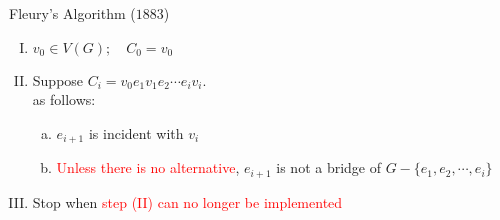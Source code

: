 
\begin{frame}{}
  

  \begin{columns}
      \begin{center}
	\pause
	 \\[5pt]
	\pause
	 \\[5pt]
	\pause
      \end{center}
  \end{columns}
\end{frame}

\begin{frame}{}
  \begin{exampleblock}{Fleury's Algorithm ($1883$)}
    \begin{enumerate}[(I)]
      \setlength{\itemsep}{8pt}
      \item $v_0 \in V(G); \quad C_0 = v_0$
      \item Suppose $C_i = v_0 e_1 v_1 e_2 \cdots e_i v_i$. \\[4pt]
	 as follows:
	\begin{enumerate}[(a)]
	  \setlength{\itemsep}{4pt}
	  \item $e_{i+1}$ is incident with $v_i$
	  \item \textcolor<4->{red}{Unless there is no alternative}, $e_{i+1}$ is not a bridge of $G - \{e_1, e_2, \cdots, e_i\}$ 
	\end{enumerate}
      \item Stop when \textcolor<3->{red}{step (II) can no longer be implemented}
    \end{enumerate}
  \end{exampleblock}

  \begin{columns}
  \end{columns}
\end{frame}

